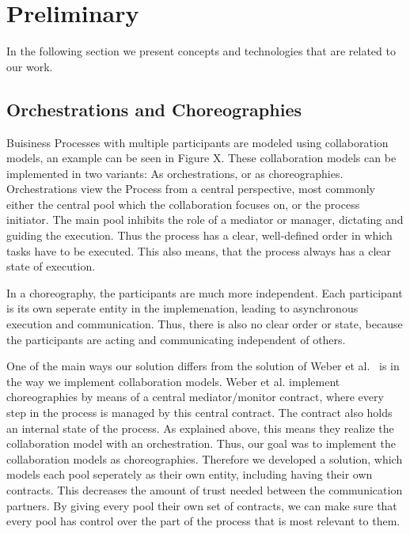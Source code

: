 \documentclass[runningheads]{llncs}
\begin{document}
\section{Preliminary}
In the following section we present concepts and technologies that are related to our work.

\subsection{Orchestrations and Choreographies}

Buisiness Processes with multiple participants are modeled using collaboration models, an example can be seen in Figure X. %
These collaboration models can be implemented in two variants: As orchestrations, or as choreographies.
Orchestrations view the Process from a central perspective, most commonly either the central pool which the collaboration focuses on, or the process initiator.
The main pool inhibits the role of a mediator or manager, dictating and guiding the execution.
Thus the process has a clear, well-defined order in which tasks have to be executed.
This also means, that the process always has a clear state of execution.

In a choreography, the participants are much more independent. 
Each participant is its own seperate entity in the implemenation, leading to asynchronous execution and communication.
Thus, there is also no clear order or state, because the participants are acting and communicating independent of others.

One of the main ways our solution differs from the solution of Weber et al.~\cite{weber2016untrusted} is in the way we implement collaboration models.
Weber et al. implement choreographies by means of a central mediator/monitor contract, where every step in the process is managed by this central contract.
The contract also holds an internal state of the process.
As explained above, this means they realize the collaboration model with an orchestration.
Thus, our goal was to implement the collaboration models as choreographies.
Therefore we developed a solution, which models each pool seperately as their own entity, including having their own contracts.
This decreases the amount of trust needed between the communication partners.
By giving every pool their own set of contracts, we can make sure that every pool has control over the part of the process that is most relevant to them.
\end{document}
